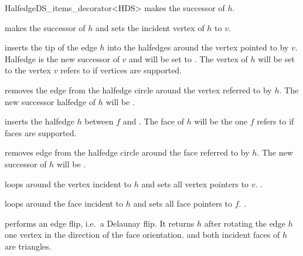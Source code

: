 \begin{ccRefClass}{HalfedgeDS_items_decorator<HDS>}
    {makes  the successor of $h$.}

    {makes  the successor of $h$ and sets the
    incident vertex of $h$ to $v$.}

    {inserts the tip of the edge $h$ into the halfedges around the vertex 
    pointed to by $v$. Halfedge  is the new successor of 
    $v$ and  will be set to . The vertex of $h$
    will be set to the vertex $v$ refers to if vertices are supported.}

   {removes the edge  from the halfedge
   circle around the vertex referred to by $h$. The new successor
   halfedge of $h$ will be  .}

    {inserts the halfedge $h$ between $f$ and .
    The face of $h$ will be the one $f$ refers to if faces
    are supported.}

   {removes edge  from the halfedge circle around 
    the face referred to by $h$. The new successor of $h$ will be 
    .}

   {loops around the vertex incident to $h$ and sets all vertex
    pointers to $v$. \ccPrecond {}.}

   {loops around the face incident to $h$ and sets all face 
    pointers to $f$. \ccPrecond {}.}

   {performs an edge flip, i.e.~a Delaunay flip. It returns $h$ after
    rotating the edge $h$ one vertex in the direction of the face
    orientation. 
    \ccPrecond {} and both incident faces 
    of $h$ are triangles.}



\end{ccRefClass}
